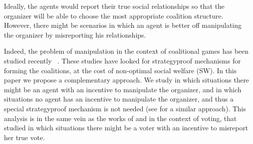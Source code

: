 \documentclass{article}
\begin{document}
Ideally, the agents would report their true social relationships so that the organizer will be able to choose the most appropriate
coalition structure. 
However, there might be scenarios in which an agent is better off manipulating the organizer by misreporting his relationships.



Indeed, the problem of manipulation in the context of coalitional games has been studied recently ~\cite{wright2015mechanism,flammini2017strategyproof}. These studies have looked for strategyproof mechanisms for forming the coalitions, at the cost of non-optimal social welfare (SW).
In this paper we propose a complementary approach. We study in which situations there might be an agent with an incentive to manipulate the organizer, and in which situations no agent has an incentive to manipulate the organizer, and thus a special strategyproof mechanism is not needed (see \cite{vallee2014study} for a similar approach). 
This analysis is in the same vein as the works of \cite{gibbard1973manipulation} and \cite{satterthwaite1975strategy} in the context of voting, that studied in which situations there might be a voter with an incentive to misreport her true vote.

\end{document}
